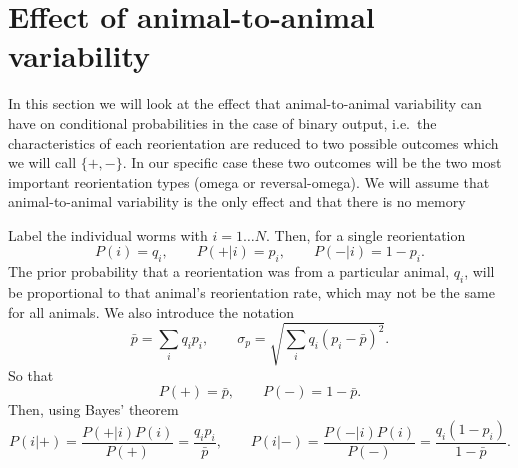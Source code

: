 \documentclass[12pt]{article}
\newcommand{\ie}{i.e.\ }
\begin{document}
\section{Effect of animal-to-animal variability}\label{sec:variability}

In this section we will look at the effect that animal-to-animal variability can have on conditional probabilities in the case of binary output, \ie the characteristics of each reorientation are reduced to two possible outcomes which we will call $\{+,-\}$. In our specific case these two outcomes will be the two most important reorientation types (omega or reversal-omega). We will assume that animal-to-animal variability is the only effect and that there is no memory

Label the individual worms with $i=1\ldots N$. Then, for a single reorientation
%
\begin{equation}\label{eq:varisinglereo}
  P(i) = q_i, \qquad
  P(+|i) = p_i, \qquad
  P(-|i) = 1-p_i.
\end{equation}
%
The prior probability that a reorientation was from a particular animal, $q_i$, will be proportional to that animal's reorientation rate, which may not be the same for all animals. We also introduce the notation
%
\begin{equation}\label{eq:varinot}
  \bar{p} = \sum_i q_i p_i, \qquad
  \sigma_p = \sqrt{\sum_i q_i(p_i-\bar{p})^2}.
\end{equation}
%
So that
%
\begin{equation}\label{eq:varimarg}
  P(+) = \bar{p}, \qquad P(-) = 1-\bar{p}.
\end{equation}
%
Then, using Bayes' theorem
%
\begin{equation}\label{eq:singlereobayes}
  P(i|+) = \frac{P(+|i)P(i)}{P(+)} = \frac{q_ip_i}{\bar{p}}, \qquad
  P(i|-) = \frac{P(-|i)P(i)}{P(-)} = \frac{q_i(1-p_i)}{1-\bar{p}}.
\end{equation}
%
\end{document}
